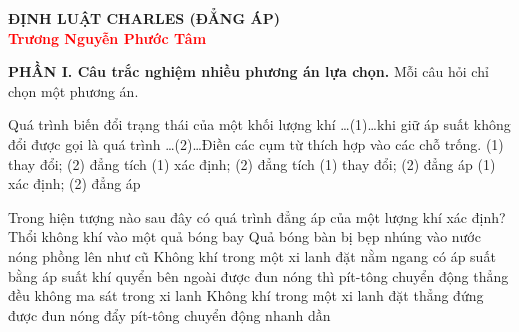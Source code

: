 \documentclass[12pt,a4paper,oneside]{article}
\begin{document}
	
	
\begin{center}
	\large\bfseries ĐỊNH LUẬT CHARLES (ĐẲNG ÁP)\\
	\bfseries \textcolor{red}{Trương Nguyễn Phước Tâm}
\end{center}
	
\vspace{0.2cm}
\noindent\textbf{PHẦN I. Câu trắc nghiệm nhiều phương án lựa chọn.} Mỗi câu hỏi chỉ chọn một phương án.
\begin{ex}
	Quá trình biến đổi trạng thái của một khối lượng khí \dots(1)\dots khi giữ áp suất không đổi được gọi là quá trình \dots(2)\dots Điền các cụm từ thích hợp vào các chỗ trống.
	\choice
	{(1) thay đổi; (2) đẳng tích}
	{(1) xác định; (2) đẳng tích}
	{(1) thay đổi; (2) đẳng áp}
	{(1) xác định; (2) đẳng áp}
\end{ex}

\begin{ex}
	Trong hiện tượng nào sau đây có quá trình đẳng áp của một lượng khí xác định?
	\choice
	{Thổi không khí vào một quả bóng bay}
	{Quả bóng bàn bị bẹp nhúng vào nước nóng phồng lên như cũ}
	{Không khí trong một xi lanh đặt nằm ngang có áp suất bằng áp suất khí quyển bên ngoài được đun nóng thì pít-tông chuyển động thẳng đều không ma sát trong xi lanh}
	{Không khí trong một xi lanh đặt thẳng đứng được đun nóng đẩy pít-tông chuyển động nhanh dần}
\end{ex}
\end{document}
